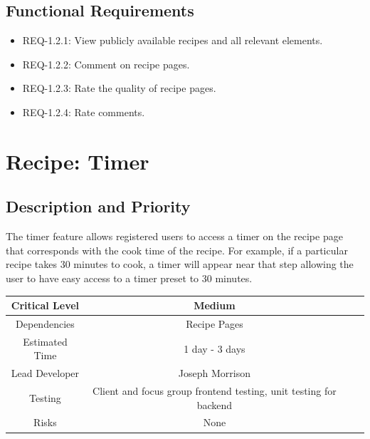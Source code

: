 \documentclass{scrreprt}
\begin{document}
\subsection{Functional Requirements}

\begin{itemize}
    \item REQ-1.2.1: View publicly available recipes and all relevant elements.
    \item REQ-1.2.2: Comment on recipe pages.
    \item REQ-1.2.3: Rate the quality of recipe pages.
    \item REQ-1.2.4: Rate comments.
\end{itemize}

\section{Recipe: Timer}

\subsection{Description and Priority}

The timer feature allows registered users to access a timer on the recipe page that corresponds with the cook time of the recipe. For example, if a particular recipe takes 30 minutes to cook, a timer will appear near that step allowing the user to have easy access to a timer preset to 30 minutes.

\begin{center}
    \begin{tabular}{| c | c | c | c |}
        \hline
        Critical Level & Medium                                                            \\
        \hline
        Dependencies   & Recipe Pages                                                      \\
        \hline
        Estimated Time & 1 day - 3 days                                                    \\
        \hline
        Lead Developer & Joseph Morrison                                                   \\
        \hline
        Testing        & Client and focus group frontend testing, unit testing for backend \\
        \hline
        Risks          & None                                                              \\
        \hline
    \end{tabular}
\end{center}
\end{document}
